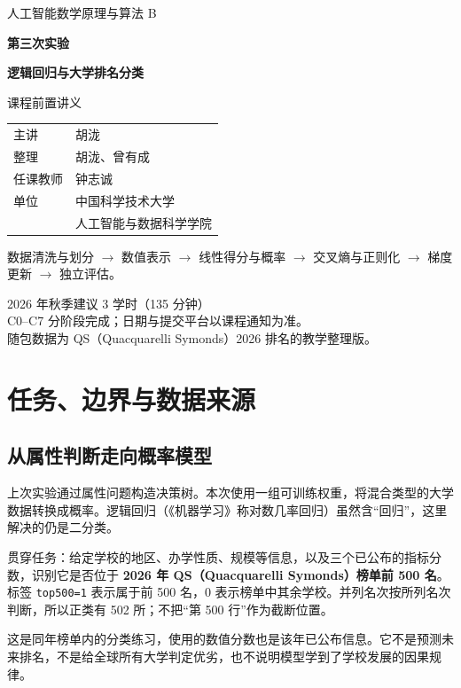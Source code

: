 \documentclass[UTF8,a4paper,11pt,fontset=fandol]{ctexart}
\begin{document}
\hypersetup{pageanchor=false}
\begin{titlepage}
\thispagestyle{empty}
\vspace*{1.4cm}
{\Large\color{Navy}人工智能数学原理与算法 B\par}
\vspace{1.0cm}
{\huge\bfseries\color{Ink}第三次实验\par}
\vspace{.4cm}
{\LARGE\bfseries\color{Navy}逻辑回归与大学排名分类\par}
\vspace{.8cm}
{\Large 课程前置讲义\par}
\vspace{1.1cm}
\begin{tabular}{@{}ll}
主讲 & 胡泷\\[.5em]
整理 & 胡泷、曾有成\\[.5em]
任课教师 & 钟志诚\\[.5em]
单位 & 中国科学技术大学\\
 & 人工智能与数据科学学院
\end{tabular}
\vspace{1cm}
\begin{keybox}[从数据到可解释的分类流程]
数据清洗与划分 $\rightarrow$ 数值表示 $\rightarrow$ 线性得分与概率
$\rightarrow$ 交叉熵与正则化 $\rightarrow$ 梯度更新 $\rightarrow$ 独立评估。
\end{keybox}
\vfill
2026 年秋季\quad 建议 3 学时（135 分钟）\\
C0--C7 分阶段完成；日期与提交平台以课程通知为准。\\
随包数据为 QS（Quacquarelli Symonds）2026 排名的教学整理版。
\end{titlepage}
\hypersetup{pageanchor=true}
\tableofcontents\clearpage{}
\section{任务、边界与数据来源}
\subsection{从属性判断走向概率模型}
上次实验通过属性问题构造决策树。本次使用一组可训练权重，将混合类型的大学数据转换成概率。逻辑回归（《机器学习》称对数几率回归）虽然含“回归”，这里解决的仍是二分类。

贯穿任务：给定学校的地区、办学性质、规模等信息，以及三个已公布的指标分数，识别它是否位于 \textbf{2026 年 QS（Quacquarelli Symonds）榜单前 500 名}。标签 \texttt{top500=1} 表示属于前 500 名，0 表示榜单中其余学校。并列名次按所列名次判断，所以正类有 502 所；不把“第 500 行”作为截断位置。
\begin{keybox}[这是什么任务]
这是同年榜单内的分类练习，使用的数值分数也是该年已公布信息。它不是预测未来排名，不是给全球所有大学判定优劣，也不说明模型学到了学校发展的因果规律。
\end{keybox}
\end{document}
